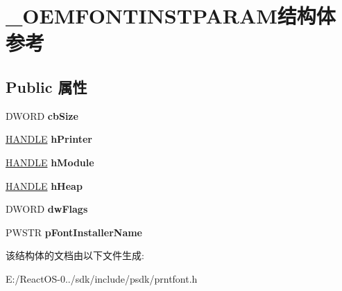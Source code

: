 \hypertarget{struct___o_e_m_f_o_n_t_i_n_s_t_p_a_r_a_m}{}\section{\+\_\+\+O\+E\+M\+F\+O\+N\+T\+I\+N\+S\+T\+P\+A\+R\+A\+M结构体 参考}
\label{struct___o_e_m_f_o_n_t_i_n_s_t_p_a_r_a_m}
\subsection*{Public 属性}
\begin{DoxyCompactItemize}
\item 
\mbox{\label{struct___o_e_m_f_o_n_t_i_n_s_t_p_a_r_a_m_a21e785e3e2590d701203f5a0fa28aee5}} 
D\+W\+O\+RD {\bfseries cb\+Size}
\item 
\mbox{\label{struct___o_e_m_f_o_n_t_i_n_s_t_p_a_r_a_m_afe1ec37490d8ec5ce7113d0a497755eb}} 
\hyperlink{interfacevoid}{H\+A\+N\+D\+LE} {\bfseries h\+Printer}
\item 
\mbox{\label{struct___o_e_m_f_o_n_t_i_n_s_t_p_a_r_a_m_a8395706652c9f93f47e479c973dbff62}} 
\hyperlink{interfacevoid}{H\+A\+N\+D\+LE} {\bfseries h\+Module}
\item 
\mbox{\label{struct___o_e_m_f_o_n_t_i_n_s_t_p_a_r_a_m_add06fcd0cf8bc239ccfe653c57b6092f}} 
\hyperlink{interfacevoid}{H\+A\+N\+D\+LE} {\bfseries h\+Heap}
\item 
\mbox{\label{struct___o_e_m_f_o_n_t_i_n_s_t_p_a_r_a_m_a6a62c2e2c405c8c3e98245c7ed54846f}} 
D\+W\+O\+RD {\bfseries dw\+Flags}
\item 
\mbox{\label{struct___o_e_m_f_o_n_t_i_n_s_t_p_a_r_a_m_a712fb98753d3a880ee69c29e59c1887f}} 
P\+W\+S\+TR {\bfseries p\+Font\+Installer\+Name}
\end{DoxyCompactItemize}


该结构体的文档由以下文件生成\+:\begin{DoxyCompactItemize}
\item 
E\+:/\+React\+O\+S-\/0../sdk/include/psdk/prntfont.\+h\end{DoxyCompactItemize}
